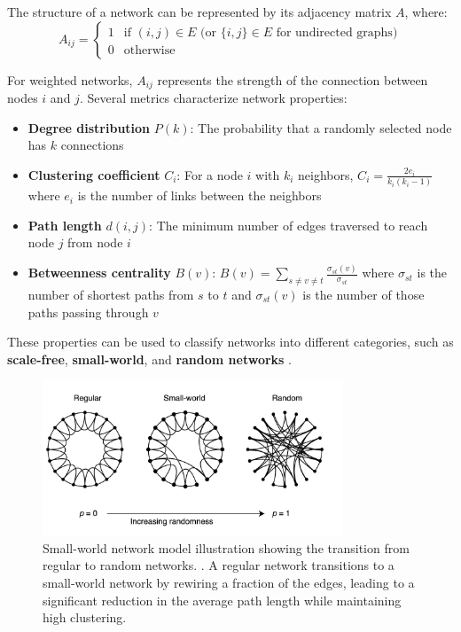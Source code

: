 The structure of a network can be represented by its adjacency matrix $A$, where:
\begin{equation}
A_{ij} =
\begin{cases}
1 & \text{if } (i,j) \in E \text{ (or } \{i,j\} \in E \text{ for undirected graphs)} \\
0 & \text{otherwise}
\end{cases}
\end{equation}

For weighted networks, $A_{ij}$ represents the strength of the connection between nodes $i$ and $j$. Several metrics characterize network properties:

\begin{itemize}
    \item \textbf{Degree distribution} $P(k)$: The probability that a randomly selected node has $k$ connections
    \item \textbf{Clustering coefficient} $C_i$: For a node $i$ with $k_i$ neighbors, $C_i = \frac{2e_i}{k_i(k_i-1)}$ where $e_i$ is the number of links between the neighbors
    \item \textbf{Path length} $d(i,j)$: The minimum number of edges traversed to reach node $j$ from node $i$
    \item \textbf{Betweenness centrality} $B(v)$: $B(v) = \sum_{s \neq v \neq t} \frac{\sigma_{st}(v)}{\sigma_{st}}$ where $\sigma_{st}$ is the number of shortest paths from $s$ to $t$ and $\sigma_{st}(v)$ is the number of those paths passing through $v$
\end{itemize}

These properties can be used to classify networks into different categories, such as \textbf{scale-free}, \textbf{small-world}, and \textbf{random networks} \citep{barabasi1999emergence, watts1998collective}.

\begin{figure}[htbp]
    \centering
    \includegraphics[width=0.8\textwidth]{figures/networks.png}
    \caption{Small-world network model illustration showing the transition from regular to random networks. \citep{watts1998collective}. A regular network transitions to a small-world network by rewiring a fraction of the edges, leading to a significant reduction in the average path length while maintaining high clustering.}
    \label{fig:small_world}
\end{figure}

